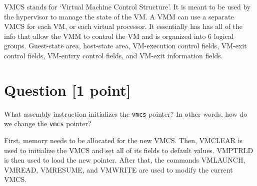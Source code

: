 \documentclass[11pt]{article}
\begin{document}
\begin{solution}
VMCS stands for `Virtual Machine Control Structure'. It is meant to be used by the hypervisor to manage the 
state of the VM. A VMM can use a separate VMCS for each VM, or each virtual processor. It essentially has 
has all of the info that allow the VMM to control the VM and is organized into 6 logical groups. 
Guest-state area, host-state area, VM-execution control fields, VM-exit control fields, VM-entrry control 
fields, and VM-exit information fields. 
\end{solution}


\section{Question [1 point]}

What assembly instruction initializes the \texttt{vmcs} pointer? 
In other words, how do we change the \texttt{vmcs} pointer?

\begin{solution}
First, memory needs to be allocated for the new VMCS. Then, VMCLEAR is used to initialize the VMCS 
and set all of its fields to default values. VMPTRLD is then used to load the new pointer. After that, 
the commands VMLAUNCH, VMREAD, VMRESUME, and VMWRITE are used to modify the current VMCS. 
\end{solution}
\end{document}
